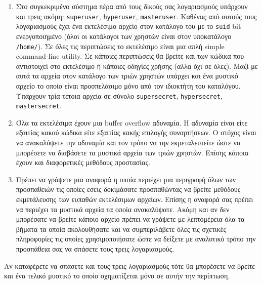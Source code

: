 \documentclass[11pt,a4paper]{article}
\begin{document}
\begin{enumerate}
\item Στο συγκεκριμένο σύστημα πέρα από τους δικούς σας λογαριασμούς
υπάρχουν και τρεις ακόμη:
{\tt superuser}, {\tt hyperuser}, {\tt masteruser}. Καθένας
από αυτούς τους λογαριασμούς έχει ένα εκτελέσιμο αρχείο
στον κατάλογο του με το 
 {\tt suid} bit ενεργοποιημένο (όλοι οι κατάλογοι των χρηστών
 είναι στον υποκατάλογο  {\tt /home/}). Σε όλες τις περιπτώσεις
 το εκτελέσιμο είναι μια απλή 
 simple command-line utility. Σε κάποιες περιπτώσεις
 θα βρείτε και των κώδικα που αντιστοιχεί στο εκτελέσιμο ή κάποιες
 οδηγίες χρήσης  (αλλα όχι σε όλες). 
 Μαζί με αυτά τα αρχεία  στον κατάλογο των τριών χρηστών
 υπάρχει και ένα μυστικό αρχείο το οποίο είναι προσπελάσιμο
 μόνο από τον ιδιοκτήτη του καταλόγου.  Υπάρχουν
 τρία τέτοια  αρχεία σε σύνολο 
 {\tt supersecret}, {\tt hypersecret}, {\tt mastersecret}.

\item 
Όλα τα εκτελέσιμα έχουν μια buffer overflow αδυναμία.
Η  αδυναμία  είναι είτε εξαιτίας κακού κώδικα είτε εξαιτίας
κακής επιλογής συναρτήσεων. 
Ο στόχος είναι να ανακαλύψετε την αδυναμία  και τον τρόπο
να την εκμεταλευτείτε ώστε να μπορέσετε να διαβάσετε 
τα μυστικά αρχεία των τριών χρηστών. Επίσης κάποια
έχουν και διαφορετικές μεθόδους προστασίας. 

\item Πρέπει να γράψετε μια αναφορά η οποία 
περιέχει μια περιγραφή όλων των προσπαθειών τις
οποίες εσεις δοκιμάσατε προσπαθώντας να βρείτε  μεθόδους
εκμετάλευσης των ευπαθών εκτελέσιμων αρχείων. 
Επίσης η αναφορά σας πρέπει να περιέχει τα μυστικά αρχεία
τα οποία ανακαλύψατε.  Ακόμη και αν δεν μπορέσατε
να βρείτε κάποιο αρχείο πρέπει να γράψετε με λεπτομέρεια
όλα τα βήματα τα οποία ακολουθήσατε και να συμπεριλάβετε
όλες τις σχετικές πληροφορίες τις οποίες χρησιμοποιήσατε ώστε
να δείξετε με αναλυτικό τρόπο την προσπάθεια σας να σπάσετε
τους τρεις λογαριασμούς. 
\end{enumerate}

Αν καταφέρετε να  σπάσετε και τους τρεις λογαριασμούς τότε
θα μπορέσετε να βρείτε και ένα τελικό μυστικό το οποίο σχηματίζεται
μόνο σε αυτήν την περίπτωση. 
\end{document}
